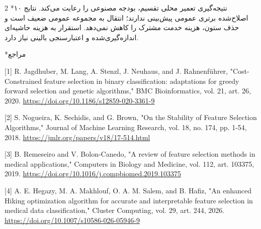 \documentclass[10pt,a4paper]{article}
\makeatletter
\renewcommand{\section}{\@startsection{section}{1}{0pt}{5pt}{2pt}{\normalfont\normalsize\bfseries}}
\newcommand{\sect}[1]{\section*{#1}}
\makeatother
\begin{document}
\begin{multicols}{2}
\sect{۱۰  نتیجه‌گیری}
تعمیر محلی تقسیم، بودجه مصنوعی را رعایت می‌کند. نتایج اصلاح‌شده برتری عمومی پیش‌بینی ندارند؛ انتقال به مجموعه عمومی ضعیف است و حذف ستون، هزینه خدمت مشترک را کاهش نمی‌دهد. استقرار به هزینه حاشیه‌ای اندازه‌گیری‌شده و اعتبارسنجی بالینی نیاز دارد.

\sect{مراجع}
\begin{minipage}{\linewidth}{\fontsize{7}{8.2}\selectfont \begin{latin}[1] R. Jagdhuber, M. Lang, A. Stenzl, J. Neuhaus, and J. Rahnenführer, "Cost-Constrained feature selection in binary classification: adaptations for greedy forward selection and genetic algorithms," BMC Bioinformatics, vol. 21, art. 26, 2020. \url{https://doi.org/10.1186/s12859-020-3361-9}\end{latin}\par}\end{minipage}\par
\begin{minipage}{\linewidth}{\fontsize{7}{8.2}\selectfont \begin{latin}[2] S. Nogueira, K. Sechidis, and G. Brown, "On the Stability of Feature Selection Algorithms," Journal of Machine Learning Research, vol. 18, no. 174, pp. 1-54, 2018. \url{https://jmlr.org/papers/v18/17-514.html}\end{latin}\par}\end{minipage}\par
\begin{minipage}{\linewidth}{\fontsize{7}{8.2}\selectfont \begin{latin}[3] B. Remeseiro and V. Bolon-Canedo, "A review of feature selection methods in medical applications," Computers in Biology and Medicine, vol. 112, art. 103375, 2019. \url{https://doi.org/10.1016/j.compbiomed.2019.103375}\end{latin}\par}\end{minipage}\par
\begin{minipage}{\linewidth}{\fontsize{7}{8.2}\selectfont \begin{latin}[4] A. E. Hegazy, M. A. Makhlouf, O. A. M. Salem, and B. Hafiz, "An enhanced Hiking optimization algorithm for accurate and interpretable feature selection in medical data classification," Cluster Computing, vol. 29, art. 244, 2026. \url{https://doi.org/10.1007/s10586-026-05946-9}\end{latin}\par}\end{minipage}\par

\end{multicols}
\end{document}
